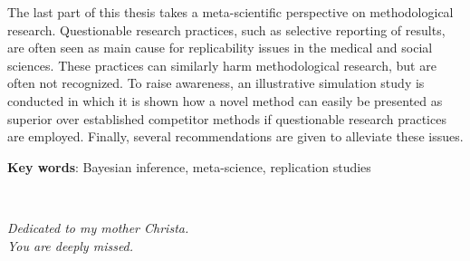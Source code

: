 The last part of this thesis takes a meta-scientific perspective on
methodological research. Questionable research practices, such as selective
reporting of results, are often seen as main cause for replicability issues in
the medical and social sciences. These practices can similarly harm
methodological research, but are often not recognized. To raise awareness, an
illustrative simulation study is conducted in which it is shown how a novel
method can easily be presented as superior over established competitor methods
if questionable research practices are employed. Finally, several
recommendations are given to alleviate these issues.


\textbf{Key words}: Bayesian inference, meta-science, replication studies


\newpage ~

\newpage



\begin{center}
  \vspace*{5cm}

  \textit{Dedicated to my mother Christa. \\
    You are deeply missed.}
\end{center}
